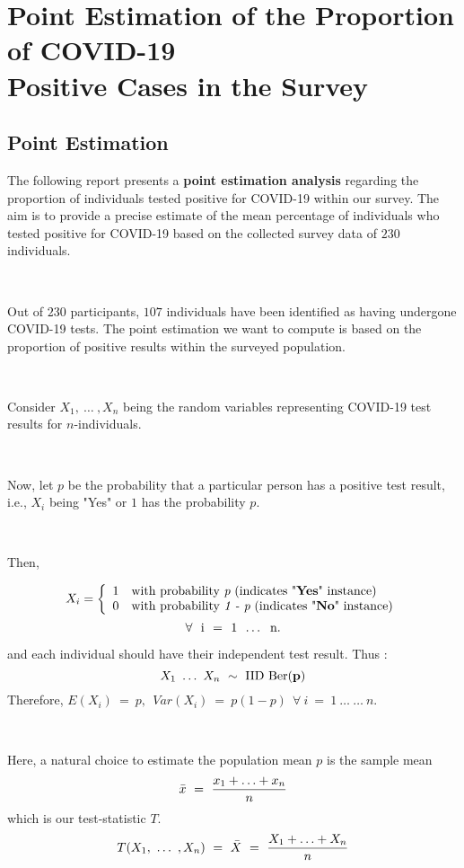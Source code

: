 \section{Point Estimation of the Proportion of COVID-19 \\ Positive Cases in the Survey}

\subsection{Point Estimation}

The following report presents a \textbf{point estimation analysis} regarding the proportion of individuals tested positive for COVID-19 within our survey. The aim is to provide a precise estimate of the mean percentage of individuals who tested positive for COVID-19 based on the collected survey data of $230$ individuals.

\

Out of $230$ participants, $107$ individuals have been identified as having undergone COVID-19 tests. The point estimation we want to compute is based on the proportion of positive results within the surveyed population.

\ 

Consider $X_{1}, \ \ldots \ , X_{n}$ being the random variables representing COVID-19 test results for $n$-individuals.

\ 

Now, let $p$ be the probability that a particular person has a positive test result, i.e., $X_{i}$ being "Yes" or $1$ has the probability $p$.

\ 

Then,

\[ 
X_{i} = \left\{
\begin{array}{ll}
        1 & \text{with probability } \textit{p} \text{ (indicates "\textbf{Yes}" instance)} \\
        0 & \text{with probability } \textit{1 - p} \text{ (indicates "\textbf{No}" instance)}
\end{array} 
\right. 
\]
$$\forall \text{ \ i \ = \ 1 \ \ldots \, n}.$$

and each individual should have their independent test result. Thus :
$$X_{1} \ \ldots \ X_{n} \ \sim \ \text{IID Ber(\textbf{p})}$$
Therefore, $E(X_{i}) \ = \ p, \ \ Var(X_{i}) \ = \ p(1 - p) \ \ \forall \ i \ = \ 1 \ \ldots \ \ldots \ n$.

\

Here, a natural choice to estimate the population mean $p$ is the sample mean
$$\Bar{x} \ = \ \frac{x_{1} + \ldots + x_{n}}{n}$$
which is our test-statistic $T$.
$$T(X_{1}, \ \ldots \ , X_{n}) \ = \ \Bar{X} \ = \ \frac{X_{1} + \ldots + X_{n}}{n}$$

